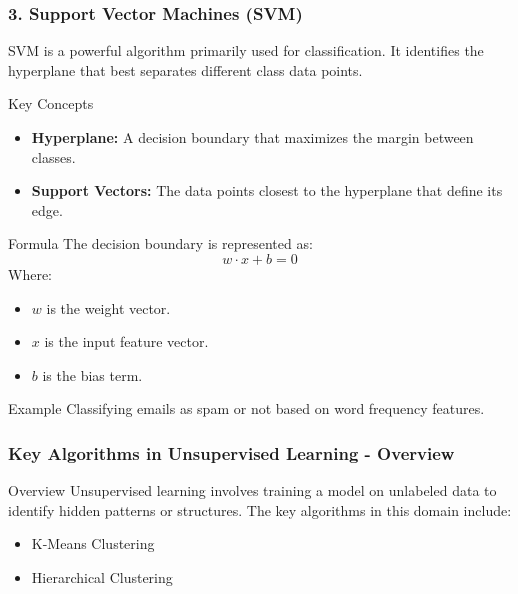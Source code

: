 \documentclass[aspectratio=169]{beamer}
\begin{document}
\begin{frame}[fragile]
    \frametitle{3. Support Vector Machines (SVM)}
    SVM is a powerful algorithm primarily used for classification. It identifies the hyperplane that best separates different class data points.
    
    \begin{block}{Key Concepts}
        \begin{itemize}
            \item \textbf{Hyperplane:} A decision boundary that maximizes the margin between classes.
            \item \textbf{Support Vectors:} The data points closest to the hyperplane that define its edge.
        \end{itemize}
    \end{block}
    
    \begin{block}{Formula}
        The decision boundary is represented as:
        \begin{equation}
            w \cdot x + b = 0
        \end{equation}
        Where:
        \begin{itemize}
            \item \(w\) is the weight vector.
            \item \(x\) is the input feature vector.
            \item \(b\) is the bias term.
        \end{itemize}
    \end{block}
    
    \begin{block}{Example}
        Classifying emails as spam or not based on word frequency features.
    \end{block}
\end{frame}

\begin{frame}[fragile]
    \frametitle{Key Algorithms in Unsupervised Learning - Overview}
    \begin{block}{Overview}
        Unsupervised learning involves training a model on unlabeled data to identify hidden patterns or structures. The key algorithms in this domain include:
        \begin{itemize}
            \item K-Means Clustering
            \item Hierarchical Clustering
        \end{itemize}
    \end{block}
\end{frame}
\end{document}
